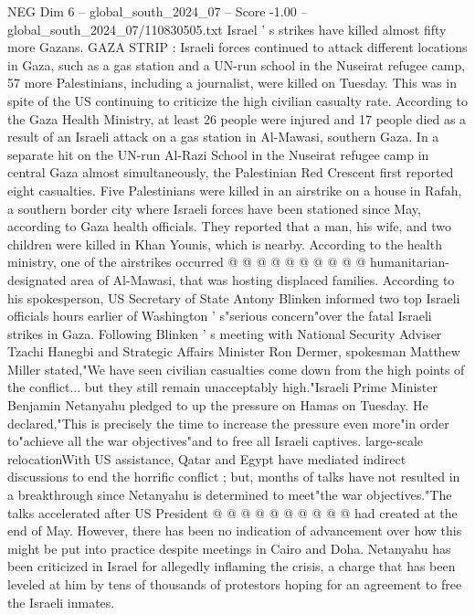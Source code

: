 \begin{textsample}{NEG Dim 6 – global\_south\_2024\_07 – Score -1.00 – global\_south\_2024\_07/110830505.txt}  \label{ex:f6_neg_122}
Israel ' s strikes have killed almost fifty more Gazans.
GAZA STRIP : Israeli forces continued to attack different locations in Gaza, such as a gas station and a UN-run school in the Nuseirat refugee camp, 57 more Palestinians, including a journalist, were killed on Tuesday.
This was in spite of the US continuing to criticize the high civilian casualty rate.
According to the Gaza Health Ministry, at least 26 people were injured and 17 people died as a result of an Israeli attack on a gas station in Al-Mawasi, southern Gaza.
In a separate hit on the UN-run Al-Razi School in the Nuseirat refugee camp in central Gaza almost simultaneously, the Palestinian Red Crescent first reported eight casualties.
Five Palestinians were killed in an airstrike on a house in Rafah, a southern border city where Israeli forces have been stationed since May, according to Gaza health officials.
They reported that a man, his wife, and two children were killed in Khan Younis, which is nearby.
According to the health ministry, one of the airstrikes occurred @ @ @ @ @ @ @ @ @ @ humanitarian-designated area of Al-Mawasi, that was hosting displaced families.
According to his spokesperson, US Secretary of State Antony Blinken informed two top Israeli officials hours earlier of Washington ' s"serious concern"over the fatal Israeli strikes in Gaza.
Following Blinken ' s meeting with National Security Adviser Tzachi Hanegbi and Strategic Affairs Minister Ron Dermer, spokesman Matthew Miller stated,"We have seen civilian casualties come down from the high points of the conflict... but they still remain unacceptably high."Israeli Prime Minister Benjamin Netanyahu pledged to up the pressure on Hamas on Tuesday.
He declared,"This is precisely the time to increase the pressure even more"in order to"achieve all the war objectives"and to free all Israeli captives. large-scale relocationWith US assistance, Qatar and Egypt have mediated indirect discussions to end the horrific conflict ; but, months of talks have not resulted in a breakthrough since Netanyahu is determined to meet"the war objectives."The talks accelerated after US President @ @ @ @ @ @ @ @ @ @ had created at the end of May.
However, there has been no indication of advancement over how this might be put into practice despite meetings in Cairo and Doha.
Netanyahu has been criticized in Israel for allegedly inflaming the crisis, a charge that has been leveled at him by tens of thousands of protestors hoping for an agreement to free the Israeli inmates.

\end{textsample}
